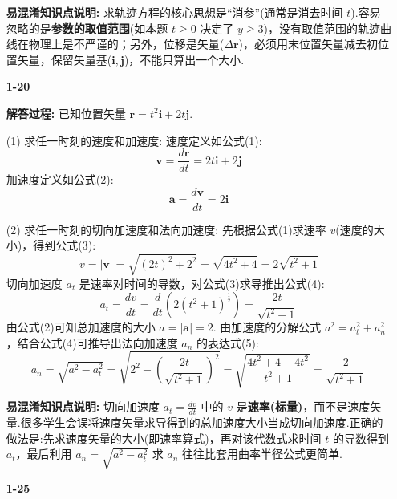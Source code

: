 \begin{enumerate}
\textbf{易混淆知识点说明:}
求轨迹方程的核心思想是“消参”(通常是消去时间 $t$).容易忽略的是\textbf{参数的取值范围}(如本题 $t \ge 0$ 决定了 $y \ge 3$)，没有取值范围的轨迹曲线在物理上是不严谨的；另外，位移是矢量($\Delta \mathbf{r}$)，必须用末位置矢量减去初位置矢量，保留矢量基($\mathbf{i}, \mathbf{j}$)，不能只算出一个大小.

\vspace{2em}

\item[\textbf{1-20}]


\textbf{解答过程:}
已知位置矢量 $\mathbf{r} = t^2\mathbf{i} + 2t\mathbf{j}$.

(1) 求任一时刻的速度和加速度:
速度定义如公式(1):
\begin{equation}
	\mathbf{v} = \frac{d\mathbf{r}}{dt} = 2t\mathbf{i} + 2\mathbf{j}
\end{equation}
加速度定义如公式(2):
\begin{equation}
	\mathbf{a} = \frac{d\mathbf{v}}{dt} = 2\mathbf{i}
\end{equation}

(2) 求任一时刻的切向加速度和法向加速度:
先根据公式(1)求速率 $v$(速度的大小)，得到公式(3):
\begin{equation}
	v = |\mathbf{v}| = \sqrt{(2t)^2 + 2^2} = \sqrt{4t^2 + 4} = 2\sqrt{t^2+1}
\end{equation}
切向加速度 $a_t$ 是速率对时间的导数，对公式(3)求导推出公式(4):
\begin{equation}
	a_t = \frac{dv}{dt} = \frac{d}{dt}\left(2(t^2+1)^{\frac{1}{2}}\right) = \frac{2t}{\sqrt{t^2+1}}
\end{equation}
由公式(2)可知总加速度的大小 $a = |\mathbf{a}| = 2$.
由加速度的分解公式 $a^2 = a_t^2 + a_n^2$，结合公式(4)可推导出法向加速度 $a_n$ 的表达式(5):
\begin{equation}
	a_n = \sqrt{a^2 - a_t^2} = \sqrt{2^2 - \left(\frac{2t}{\sqrt{t^2+1}}\right)^2} = \sqrt{\frac{4t^2+4-4t^2}{t^2+1}} = \frac{2}{\sqrt{t^2+1}}
\end{equation}

\textbf{易混淆知识点说明:}
切向加速度 $a_t = \frac{dv}{dt}$ 中的 $v$ 是\textbf{速率(标量)}，而不是速度矢量.很多学生会误将速度矢量求导得到的总加速度大小当成切向加速度.正确的做法是:先求速度矢量的大小(即速率算式)，再对该代数式求时间 $t$ 的导数得到 $a_t$，最后利用 $a_n = \sqrt{a^2 - a_t^2}$ 求 $a_n$ 往往比套用曲率半径公式更简单.

\vspace{2em}

\item[\textbf{1-25}]



\end{enumerate}

